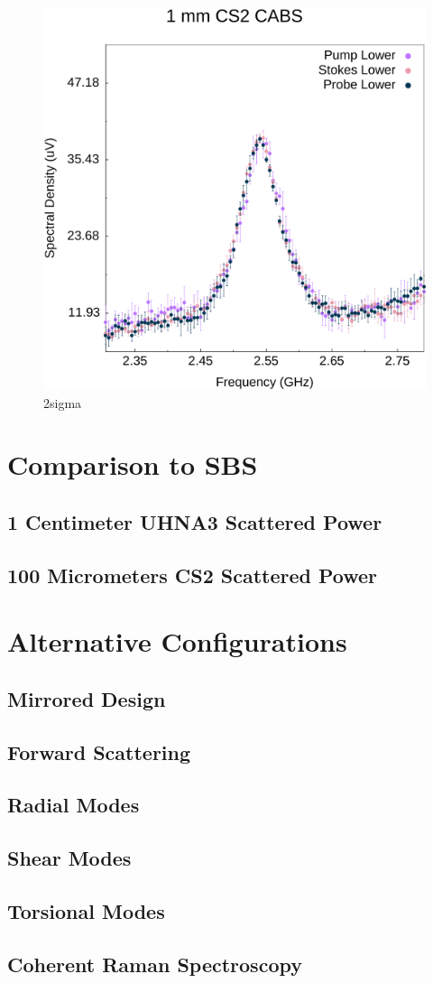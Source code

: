 \documentclass[%
  reprint,
  superscriptaddress,
  amsmath,amssymb,
  aps,
  prapplied,
]{revtex4-2}
\begin{document}
\begin{figure}[h]
  \centering
  \includegraphics[width=.45\textwidth]{PSPr-Contribute-Equally-2sigma.pdf}
  \caption{2sigma}
  \label{fig:PSPr-Contribute-Equally-2sigma}
\end{figure}

\section{Comparison to SBS}
\subsection{1 Centimeter UHNA3 Scattered Power}
\subsection{100 Micrometers CS2 Scattered Power}

\section{Alternative Configurations}
\subsection{Mirrored Design}
\subsection{Forward Scattering}
\subsection{Radial Modes}
\subsection{Shear Modes}
\subsection{Torsional Modes}
\subsection{Coherent Raman Spectroscopy}

\twocolumngrid

\end{document}
